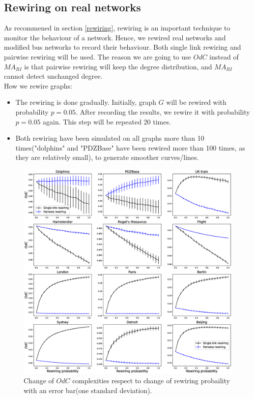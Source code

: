 \documentclass[12pt]{article}
\begin{document}
\subsection{Rewiring on real networks}
As recommened in section \ref{rewiring}, rewiring is an important technique to monitor the behaviour of a network. Hence, we rewired real networks and modified bus networks to record their behaviour. Both single link rewiring and pairwise rewiring will be used. The reason we are going to use $OdC$ instead of $MA_{RI}$ is that pairwise rewiring will keep the degree distribution, and $MA_{RI}$ cannot detect unchanged degree.\\
How we rewire graphs:
\begin{itemize}
    \item The rewiring is done gradually. Initially, graph $G$ will be rewired with probability $p=0.05$. After recording the results, we rewire it with probability $p=0.05$ again. This step will be repeated 20 times.
    \item Both rewiring have been simulated on all graphs more than 10 times("dolphins" and "PDZBase" have been rewired more than 100 times, as they are relatively small), to generate smoother curves/lines.
\end{itemize}
\begin{figure}[ht]
    \centering
    \includegraphics[width=\textwidth]{rewiring.eps}
    \caption{Change of $OdC$ complexities respect to change of rewiring probaility with an error bar(one standard deviation).}
    \label{fig:rewiring}
\end{figure}
\end{document}
